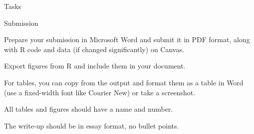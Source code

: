 \documentclass{./../Lectures/div_teaching_slides}
\begin{document}
\begin{frame}{Tasks}
\end{frame}

\begin{frame}{Submission}
\begin{witemize}
  \item Prepare your submission in Microsoft Word and submit it in PDF format, along with R code and data (if changed significantly) on Canvas.
  \item Export figures from R and include them in your document. 
  \item For tables, you can copy from the output and format them as a table in Word (use a fixed-width font like Courier New) or take a screenshot.
  \item All tables and figures should have a name and number. 
  \item The write-up should be in essay format, no bullet points.
\end{witemize}
\end{frame}
\end{document}
